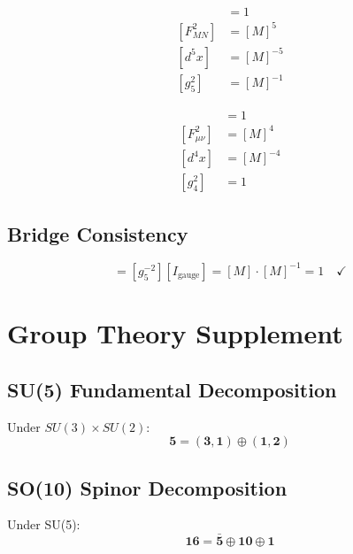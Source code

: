 \documentclass[11pt,a4paper]{article}
\begin{document}
\begin{align}
  [S_{\text{5D}}] &= 1
  \label{eq:app-s5d} \\
  [F_{MN}^2] &= [M]^5
  \label{eq:app-f5} \\
  [d^5x] &= [M]^{-5}
  \label{eq:app-d5x} \\
  [g_5^2] &= [M]^{-1}
  \label{eq:app-g5-dim}
\end{align}

\begin{align}
  [S_{\text{4D}}] &= 1
  \label{eq:app-s4d} \\
  [F_{\mu\nu}^2] &= [M]^4
  \label{eq:app-f4} \\
  [d^4x] &= [M]^{-4}
  \label{eq:app-d4x} \\
  [g_4^2] &= 1
  \label{eq:app-g4-dim}
\end{align}

\subsection{Bridge Consistency}

\begin{equation}
  [g_4^{-2}] = [g_5^{-2}][I_{\text{gauge}}] = [M] \cdot [M]^{-1} = 1 \quad \checkmark
  \label{eq:app-bridge-check}
\end{equation}

\section{Group Theory Supplement}
\label{app:group}

\subsection{SU(5) Fundamental Decomposition}

Under $SU(3) \times SU(2)$:
\begin{equation}
  \mathbf{5} = (\mathbf{3}, \mathbf{1}) \oplus (\mathbf{1}, \mathbf{2})
  \label{eq:app-5-decomp}
\end{equation}

\subsection{SO(10) Spinor Decomposition}

Under SU(5):
\begin{equation}
  \mathbf{16} = \mathbf{\bar{5}} \oplus \mathbf{10} \oplus \mathbf{1}
  \label{eq:app-16-decomp}
\end{equation}
\end{document}
